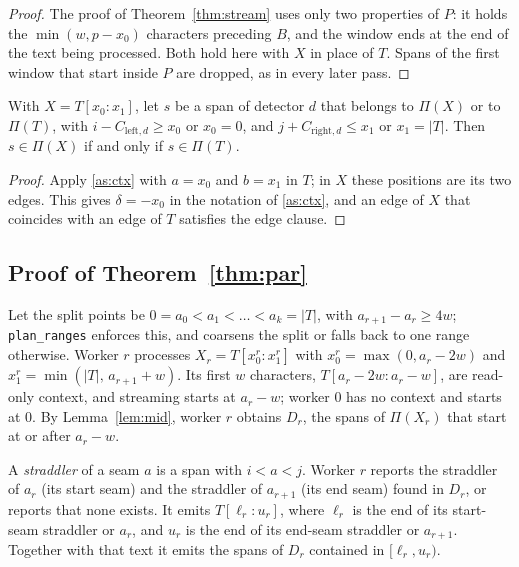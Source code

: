 \documentclass[pdflatex,sn-mathphys-num]{sn-jnl}
\theoremstyle{\ssThmStyle}
\theoremstyle{\ssDefStyle}
\begin{document}
\begin{proof}
The proof of Theorem~\ref{thm:stream} uses only two properties of $P$: it holds the $\min(w, p - x_0)$ characters preceding $B$, and the window ends at the end of the text being processed. Both hold here with $X$ in place of $T$. Spans of the first window that start inside $P$ are dropped, as in every later pass.
\end{proof}

\begin{lemma}\label{lem:transfer}
With $X = T[x_0{:}x_1]$, let $s$ be a span of detector $d$ that belongs to $\Pi(X)$ or to $\Pi(T)$, with $i - C_{\mathrm{left},d} \ge x_0$ or $x_0 = 0$, and $j + C_{\mathrm{right},d} \le x_1$ or $x_1 = |T|$. Then $s \in \Pi(X)$ if and only if $s \in \Pi(T)$.
\end{lemma}

\begin{proof}
Apply \ref{as:ctx} with $a = x_0$ and $b = x_1$ in $T$; in $X$ these positions are its two edges. This gives $\delta = -x_0$ in the notation of \ref{as:ctx}, and an edge of $X$ that coincides with an edge of $T$ satisfies the edge clause.
\end{proof}

\subsection{Proof of Theorem~\ref{thm:par}}

Let the split points be $0 = a_0 < a_1 < \dots < a_k = |T|$, with $a_{r+1} - a_r \ge 4w$; \texttt{plan\_ranges} enforces this, and coarsens the split or falls back to one range otherwise. Worker $r$ processes $X_r = T[x_0^{r} : x_1^{r}]$ with $x_0^{r} = \max(0, a_r - 2w)$ and $x_1^{r} = \min(|T|,\, a_{r+1} + w)$. Its first $w$ characters, $T[a_r - 2w : a_r - w]$, are read-only context, and streaming starts at $a_r - w$; worker $0$ has no context and starts at $0$. By Lemma~\ref{lem:mid}, worker $r$ obtains $D_r$, the spans of $\Pi(X_r)$ that start at or after $a_r - w$.

A \emph{straddler} of a seam $a$ is a span with $i < a < j$. Worker $r$ reports the straddler of $a_r$ (its start seam) and the straddler of $a_{r+1}$ (its end seam) found in $D_r$, or reports that none exists. It emits $T[\ell_r : u_r]$, where $\ell_r$ is the end of its start-seam straddler or $a_r$, and $u_r$ is the end of its end-seam straddler or $a_{r+1}$. Together with that text it emits the spans of $D_r$ contained in $[\ell_r, u_r)$.
\end{document}
